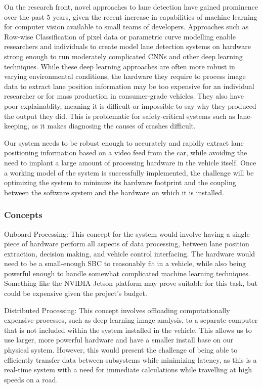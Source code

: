 \documentclass[titlepage,draft]{article}
\begin{document}
On the research front, novel approaches to lane detection have gained prominence over the past 5 years, given the recent increase in capabilities of machine learning for computer vision available to small teams of developers. Approaches such as Row-wise Classification\cite{rowwiseclass} of pixel data or parametric curve modelling \cite{feng2023rethinking} enable researchers and individuals to create model lane detection systems on hardware strong enough to run moderately complicated CNNs and other deep learning techniques. While these deep learning approaches are often more robust in varying environmental conditions, the hardware they require to process image data to extract lane position information may be too expensive for an individual researcher or for mass production in consumer-grade vehicles. They also have poor explainablity, meaning it is difficult or impossible to say why they produced the output they did. This is problematic for safety-critical systems such as lane-keeping, as it makes diagnosing the causes of crashes difficult.

Our system needs to be robust enough to accurately and rapidly extract lane positioning information based on a video feed from the car, while avoiding the need to implant a large amount of processing hardware in the vehicle itself. Once a working model of the system is successfully implemented, the challenge will be optimizing the system to minimize its hardware footprint and the coupling between the software system and the hardware on which it is installed.

\subsubsection{Concepts}
Onboard Processing: This concept for the system would involve having a single piece of hardware perform all aspects of data processing, between lane position extraction, decision making, and vehicle control interfacing. The hardware would need to be a small-enough SBC to reasonably fit in a vehicle, while also being powerful enough to handle somewhat complicated machine learning techniques. Something like the NVIDIA Jetson\cite{jetson_embeded_computing} platform may prove suitable for this task, but could be expensive given the project's budget.

Distributed Processing: This concept involves offloading computationally expensive processes, such as deep learning image analysis, to a separate computer that is not included within the system installed in the vehicle. This allows us to use larger, more powerful hardware and have a smaller install base on our physical system. However, this would present the challenge of being able to efficiently transfer data between subsystems while minimizing latency, as this is a real-time system with a need for immediate calculations while travelling at high speeds on a road.
\end{document}
